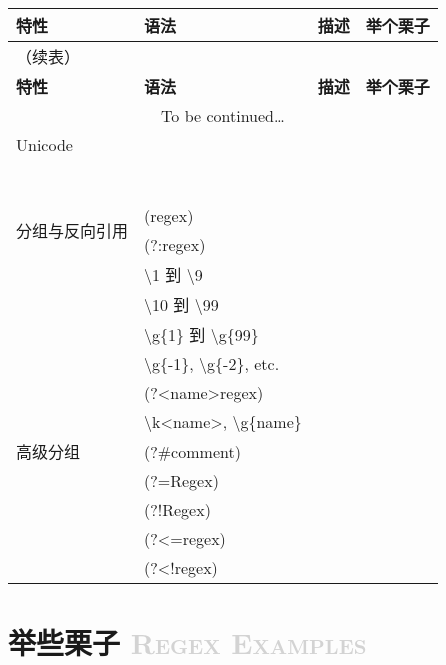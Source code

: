 \documentclass[12pt,a4paper,twoside]{ctexart}
\begin{document}
\begin{center}

\begin{longtable}{p{4em}p{9em}p{28em}p{15em}}
  \toprule
  \textbf{特性} & \textbf{语法} & \textbf{描述} & \textbf{举个栗子} \\
  \midrule
  \endfirsthead                 %
  \multicolumn{4}{l}{（续表）} \\
  \toprule
  \textbf{特性} & \textbf{语法} & \textbf{描述} & \textbf{举个栗子} \\
  \midrule
  \endhead                      %
  \midrule
  \multicolumn{4}{c}{To be continued\ldots} \\[2ex]
  \endfoot                      %
  \bottomrule
  \endlastfoot                  %
  Unicode & & & \\
  & & & \\
  & & & \\
  & & & \\
  & & & \\
  & & & \\
  & & & \\
  & & & \\
  \midrule
  \multirow{2}{4em}{分组与反向引用} & (regex) & & \\
  & (?:regex) & & \\
  & \textbackslash{}1 到 \textbackslash{}9 & & \\
  & \textbackslash{}10 到 \textbackslash{}99 & & \\
  & \textbackslash{}g\{1\} 到 \textbackslash{}g\{99\} & & \\
  & \textbackslash{}g\{-1\}, \textbackslash{}g\{-2\}, etc. & & \\
  & (?<name>regex) & & \\
  & \textbackslash{}k<name>, \textbackslash{}g\{name\} & & \\
  \midrule
  高级分组 & (?\#comment) & & \\
  & (?=Regex) & & \\
  & (?!Regex) & & \\
  & (?<=regex) & & \\
  & (?<!regex) & & \\
\end{longtable}

\end{center}

\section[举些栗子]{举些栗子 \textcolor{lightgray}{\textsc{Regex Examples}}}
\label{sec:regex-examples}
\end{document}

